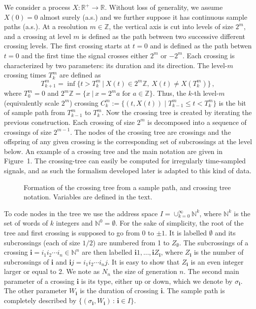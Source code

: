 \documentclass[a4paper]{article}
\newcommand{\N}{\mathbb{N}}
\newcommand{\R}{\mathbb{R}}
\newcommand{\Z}{\mathbb{Z}}
\newcommand{\bfi}{\mathbf{i}}
\begin{document}
\medskip
{}
We consider a process $X: \R^+\rightarrow\R$. Without loss of generality, we assume $X(0)=0$ almost surely (a.s.) and we further suppose it has continuous sample paths (a.s.).
At a resolution $m\in \Z$, the vertical axis is cut into levels of size $2^m$, and a crossing at level $m$ is defined as the path between two successive different crossing levels. The first crossing starts at $t=0$ and is defined as the path betwen $t=0$ and the first time the signal crosses either $2^m$ or $-2^m$. Each crossing is characterized by two parameters: its duration and its direction.
The level-$m$ crossing times $T_k^m$ are defined as 
\[
T_{k+1}^{m}= \inf\{t>T_{k}^{m}~|~X(t)\in  2^{m}\Z,~X(t)\not = X(T_{k}^{m}) \}\,,
\]
where  $T_0^m = 0$  and $2^{m}\Z=\{ x ~|~ x=2^m a \textrm{ for } a\in\Z\}$.
Thus, the $k$-th level-$m$ (equivalently scale $2^m$) crossing $C_k^m:= \{ (t,X(t))\mid T_{k-1}^m\leqslant t < T_k^m\}$ is the bit of sample path from $T_{k-1}^{m}$ to $T_{k}^{m}$.
Now the crossing tree is created by iterating the previous construction.
 Each crossing of size $2^m$ is decomposed into a sequence of crossings of size $2^{m-1}$.
The nodes of the crossing tree are crossings and the offspring of any given crossing is the corresponding set of subcrossings at the level below.
An example of a crossing tree and the main notation  are given in Figure~1.
The crossing-tree can easily be computed for irregularly time-sampled signals, and as such the formalism developed later is adapted to this kind of data.

\begin{figure}[]

\begin{minipage}[b]{0.4\linewidth}
  \centering
  
\end{minipage}

\caption{Formation of the crossing tree from a sample path, and crossing tree notation. Variables are defined in the text.}
\label{fig:ct}
%
\end{figure}

To code nodes in the tree we use
the address space $I = \cup_{k=0}^\infty \N^k$, where $\N^k$ is the set of words of $k$ integers and $\N^0=\emptyset$.
For the sake of simplicity, the root of the tree and  first crossing is supposed to go from $0$ to $\pm 1$.
It is labelled $\emptyset$ and its subcrossings (each of size $1/2$) are numbered from 1 to $Z_\emptyset$.
The subcrossings of a crossing $\bfi = i_1 i_2 \cdots i_n\in\N^n$ are then labelled $\bfi 1, \ldots, \bfi Z_\bfi$, where $Z_\bfi$ is the number of subcrossings of $\bfi$ and $\bfi j = i_1 i_2 \cdots i_n j$. 
It is easy to show that  $Z_\bfi$ is an even integer larger or equal to 2.
We note as $N_n$ the size of generation $n$.
The second main parameter of a crossing $\bfi$   is its type, either up or down, which we denote by $\sigma_\bfi$.
The other parameter $W_\bfi$ is the duration of crossing $\bfi$. The sample path is completely described by $\{ (\sigma_\bfi, W_\bfi) \,:\, \bfi \in I \}$.
\end{document}
